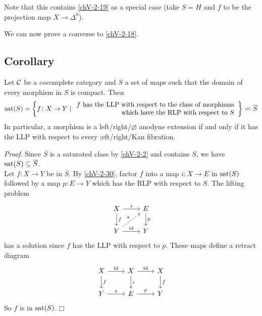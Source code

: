         Note that this contains \ref{chV-2-19} as a special case (take $S = H$ and $f$ to be the projection map $X \to \Delta^0$).
        \medskip

        We can now prove a converse to \ref{chV-2-18}.

    \subsection{Corollary}\label{chV-2-31}
        Let $\mathcal{C}$ be a cocomplete category and $S$ a set of maps such that the domain of every morphism in $S$ is compact. Then
        \begin{equation*}
            \operatorname{sat}(S) = \left\{ f \colon X \to Y \mid \begin{array}{r} f \text{ has the LLP with respect to the class of morphisms} \\ \text{which have the RLP with respect to } S\end{array} \right\} \eqcolon \overline{S}
        \end{equation*}
        In particular, a morphism is a left/right/$\varnothing$ anodyne extension if and only if it has the LLP with respect to every ;eft/right/Kan fibration.
        \smallskip

        \emph{Proof}. Since $\overline{S}$ is a saturated class by \ref{chV-2-2} and contains $S$, we have $\operatorname{sat}(S) \subseteq \overline{S}$.\\
        Let $f \colon X \to Y$ be in $\overline{S}$. By \ref{chV-2-30}, factor $f$ into a map $i \colon X \to E$ in $\operatorname{sat}(S)$ followed by a map $p \colon E \to Y$ which has the RLP with respect to $S$. The lifting problem
        \begin{equation*}
            \begin{tikzcd}
                X \arrow[r, "i"] \arrow[d, "f"] & E \arrow[d, "p"] \\
                Y \arrow[ur, dashed, "s"] \arrow[r, "\id"] & Y
            \end{tikzcd}
        \end{equation*}
        has a solution since $f$ has the LLP with respect to $p$. These maps define a retract diagram
        \begin{equation*}
            \begin{tikzcd}
                X \arrow[r, "\id"] \arrow[d, "f"] & X \arrow[r, "\id"] \arrow[d, "i"] & X \arrow[d, "f"] \\
                Y \arrow[r, "s"] & E \arrow[r, "p"] & Y
            \end{tikzcd}
        \end{equation*}
        So $f$ is in $\operatorname{sat}(S)$.\hfill$\Box$

